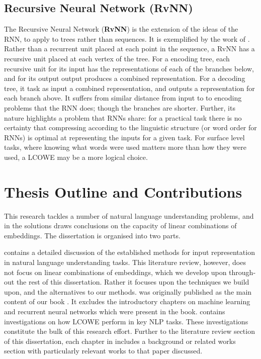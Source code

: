 \documentclass{book}
\begin{document}
\subsection {Recursive Neural Network (RvNN)}
The Recursive Neural Network (\textbf{RvNN}) is the extension of the ideas of the RNN,
to apply to trees rather than sequences.
It is exemplified by the work of \citet{socher2014recursive}.
Rather than a recurrent unit placed at each point in the sequence,
a RvNN has a recursive unit placed at each vertex of the tree.
For a encoding tree, each recursive unit for its input has the representations of each of the branches below,
and for its output output produces a combined representation.
For a decoding tree, it task as input a combined representation, and outputs a representation for each branch above.
It suffers from similar distance from input to to encoding problems that the RNN does;
though the branches are shorter.
Further, its nature highlights a problem that RNNs share:
for a practical task there is no certainty  that compressing according to the linguistic structure (or word order for RNNs) is optimal at representing the inputs for a given task.
For surface level tasks, where knowing what words were used matters more than how they were used,
a LCOWE may be a more logical choice.

\section{Thesis Outline and Contributions}
This research tackles a number of natural language understanding problems, and in the solutions draws conclusions on the capacity of linear combinations of embeddings.
The dissertation is organised into two parts.

 contains a detailed discussion of the established methods for input representation in natural language understanding tasks.
This literature review, however, does not focus on linear combinations of embeddings, which we develop upon through-out the rest of this dissertation.
Rather it focuses upon the techniques we build upon, and the alternatives to our methods.
 was originally published as the main content of our book  \citep{NRoNL}.
It excludes the introductory chapters on machine learning and recurrent neural networks which were present in the book.
 contains investigations on how LCOWE perform in key NLP tasks.
These investigations constitute the bulk of this research effort.
Further to the literature review section of this dissertation, each chapter in  includes a background or related works section with particularly relevant works to that paper discussed.
\end{document}
